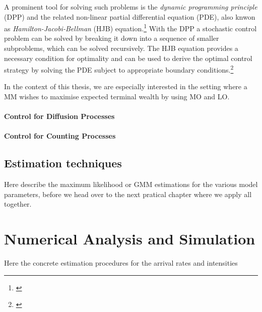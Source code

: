 \documentclass[12pt,a4paper]{cau_thesis}
\begin{document}
A prominent tool for solving such problems is the \emph{dynamic
    programming principle} (DPP) and the related non-linear partial
differential equation (PDE), also knwon as
\emph{Hamilton-Jacobi-Bellman} (HJB) equation.\footnote{\cite[See ][,
        p.100]{cartea2015algorithmic}} With the DPP a stochastic control
problem can be solved by breaking it down into a sequence of smaller
subproblems, which can be solved recursively. The HJB equation
provides a necessary condition for optimality and can be used to
derive the optimal control strategy by solving the PDE subject to
appropriate boundary conditions.\footnote{\cite[See ][,
        p.100]{cartea2015algorithmic}}

In the context of this thesis, we are especially interested in the
setting where a MM wishes to maximise expected terminal wealth by
using MO and LO.
\subsubsection{Control for Diffusion Processes}\label{sub_sub_sec:control_for_diffusion_processes}

\subsubsection{Control for Counting Processes}\label{sub_sub_sec:control_for_counting_processes}

\section{Estimation techniques}\label{sec:estimation_techniques}
Here describe the maximum likelihood or GMM estimations for the
various model parameters, before we head over to the next pratical
chapter where we apply all together.
\chapter{Numerical Analysis and Simulation}\label{ch:numerical_analysis}
Here the concrete estimation procedures for the arrival rates and
intensities
\end{document}
